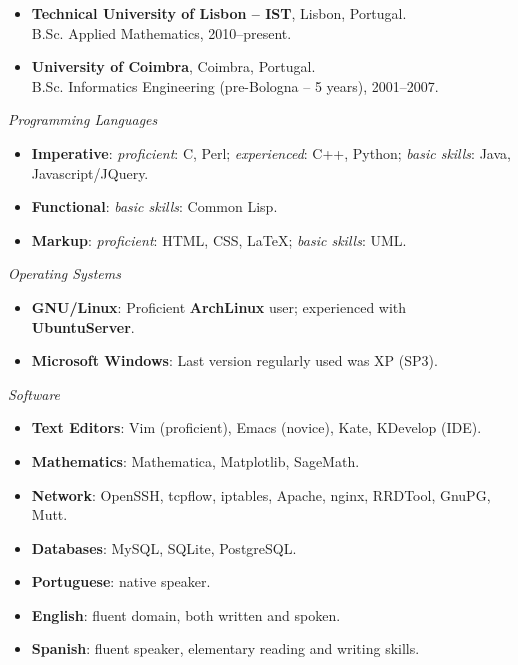 \documentclass[a4paper,9pt]{extarticle}
\newenvironment{topic}[1]
   {{\noindent\large\bfseries\raisebox{0pt}[\height][1ex]{#1}\hrule}%
    \begin{list}{}{%
       \setlength{\leftmargin}{.25cm}}%
    \item[]}
   {\end{list}\medskip}
\begin{document}
\begin{topic}{Formal Education}
  \begin{itemize}
    \item {\bfseries Technical University of Lisbon -- IST}, Lisbon, Portugal.\\
      B.Sc. Applied Mathematics, 2010--present.
    \item {\bfseries University of Coimbra}, Coimbra, Portugal.\\
      B.Sc. Informatics Engineering (pre-Bologna -- 5 years), 2001--2007.
  \end{itemize}
\end{topic}

\begin{topic}{Technical Skills}
  {\itshape Programming Languages}  
  \begin{itemize}
    \item{\bfseries Imperative}: \emph{proficient}: C, Perl; \emph{experienced}: C++, Python;
      \emph{basic skills}: Java, Javascript/JQuery.
    \item{\bfseries Functional}: \emph{basic skills}: Common Lisp.
    \item{\bfseries Markup}: \emph{proficient}: HTML, CSS, \LaTeX; \emph{basic skills}: UML.
  \end{itemize}
  {\itshape Operating Systems} 
  \begin{itemize}
    \item{\bfseries GNU/Linux}: Proficient \textbf{ArchLinux} user; experienced with \textbf{UbuntuServer}.
    \item{\bfseries Microsoft Windows}: Last version regularly used was XP (SP3).
  \end{itemize}
  {\itshape Software}
  \begin{itemize}
    \item{\bfseries Text Editors}: Vim (proficient), Emacs (novice), Kate, KDevelop (IDE).
    \item{\bfseries Mathematics}: Mathematica, Matplotlib, SageMath.
    \item{\bfseries Network}: OpenSSH, tcpflow, iptables, Apache, nginx, RRDTool, GnuPG, 
      Mutt.
    \item{\bfseries Databases}: MySQL, SQLite, PostgreSQL.
  \end{itemize}
\end{topic}

\begin{topic}{Languages}
  \begin{itemize}
    \item {\bfseries Portuguese}: native speaker.
    \item {\bfseries English}: fluent domain, both written and spoken.
    \item {\bfseries Spanish}: fluent speaker, elementary reading and writing skills.
  \end{itemize}
\end{topic}
\end{document}
